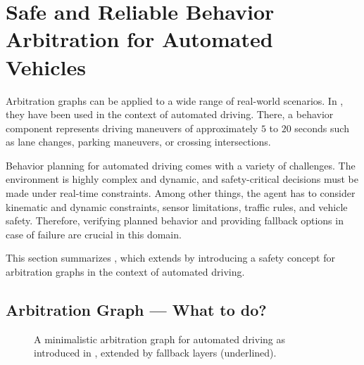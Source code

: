 \section{Safe and Reliable Behavior Arbitration for Automated Vehicles}




Arbitration graphs can be applied to a wide range of real-world scenarios.
In \cite{orzechowskiDecisionMakingAutomatedVehicles2020a},
they have been used in the context of automated driving.
There, a behavior component represents driving maneuvers of approximately $5$ to $20$ seconds
such as lane changes, parking maneuvers, or crossing intersections.

Behavior planning for automated driving comes with a variety of challenges.
The environment is highly complex and dynamic, and safety-critical decisions must be made under real-time constraints.
Among other things, the agent has to consider kinematic and dynamic constraints,
sensor limitations, traffic rules, and vehicle safety.
Therefore, verifying planned behavior and providing fallback options in case of failure are crucial in this domain.

This section summarizes \cite{orzechowskiVerhaltensentscheidungFuerAutomatisierte2023},
which extends \cite{orzechowskiDecisionMakingAutomatedVehicles2020a} by
introducing a safety concept for arbitration graphs in the context of automated driving.




\subsection{Arbitration Graph --- \textbf{What} to do?}

\begin{figure}
    \centering
    
    \caption{
        A minimalistic arbitration graph for automated driving as introduced in \cite{orzechowskiDecisionMakingAutomatedVehicles2020a}, extended by fallback layers (underlined).
    }
    \label{fig:arbitration-graph-evaluation}
\end{figure}

